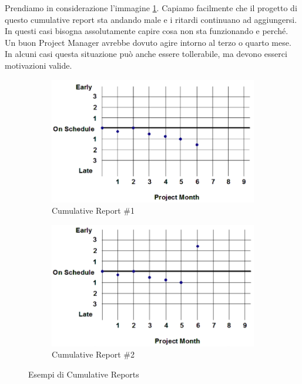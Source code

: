 \noindent Prendiamo in considerazione l'immagine \ref{cumreport1}. Capiamo facilmente che il progetto di questo cumulative report sta andando male e i ritardi continuano ad aggiungersi. In questi casi bisogna assolutamente capire cosa non sta funzionando e perché. Un buon Project Manager avrebbe dovuto agire intorno al terzo o quarto mese. In alcuni casi questa situazione può anche essere tollerabile, ma devono esserci motivazioni valide.
\begin{figure}[H]
	\centering
	\begin{subfigure}[b]{0.45\textwidth}
		\centering
		\includegraphics[width=\textwidth]{document/img/cumreport1.png}
		\caption{Cumulative Report \#1}
		\label{cumreport1}
	\end{subfigure}
	\hfill
	\begin{subfigure}[b]{0.45\textwidth}
		\centering
		\includegraphics[width=\textwidth]{document/img/cumreport2.png}
		\caption{Cumulative Report \#2}
		\label{cumreport2}
	\end{subfigure}
	\caption{Esempi di Cumulative Reports}
\end{figure}

